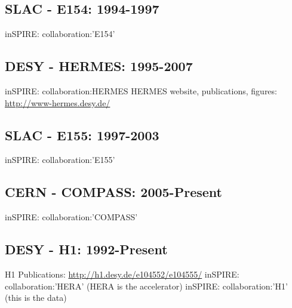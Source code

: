 \subsection{SLAC - E154: 1994-1997} 
inSPIRE: collaboration:'E154'

\subsection{DESY - HERMES: 1995-2007}
inSPIRE: collaboration:HERMES
HERMES website, publications, figures: \url{http://www-hermes.desy.de/}

\subsection{SLAC - E155: 1997-2003}
inSPIRE: collaboration:'E155'

\subsection{CERN - COMPASS: 2005-Present}
inSPIRE: collaboration:'COMPASS'

\subsection{DESY - H1: 1992-Present}
H1 Publications: \url{http://h1.desy.de/e104552/e104555/}
inSPIRE: collaboration:'HERA' (HERA is the accelerator)
inSPIRE: collaboration:'H1' (this is the data)

